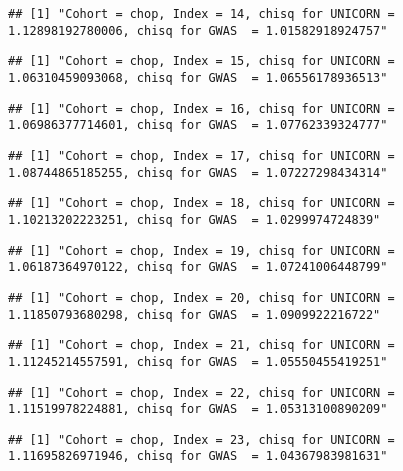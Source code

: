 \documentclass[]{article}
\begin{document}
\begin{verbatim}
## [1] "Cohort = chop, Index = 14, chisq for UNICORN = 1.12898192780006, chisq for GWAS  = 1.01582918924757"
\end{verbatim}

\begin{verbatim}
## [1] "Cohort = chop, Index = 15, chisq for UNICORN = 1.06310459093068, chisq for GWAS  = 1.06556178936513"
\end{verbatim}

\begin{verbatim}
## [1] "Cohort = chop, Index = 16, chisq for UNICORN = 1.06986377714601, chisq for GWAS  = 1.07762339324777"
\end{verbatim}

\begin{verbatim}
## [1] "Cohort = chop, Index = 17, chisq for UNICORN = 1.08744865185255, chisq for GWAS  = 1.07227298434314"
\end{verbatim}

\begin{verbatim}
## [1] "Cohort = chop, Index = 18, chisq for UNICORN = 1.10213202223251, chisq for GWAS  = 1.0299974724839"
\end{verbatim}

\begin{verbatim}
## [1] "Cohort = chop, Index = 19, chisq for UNICORN = 1.06187364970122, chisq for GWAS  = 1.07241006448799"
\end{verbatim}

\begin{verbatim}
## [1] "Cohort = chop, Index = 20, chisq for UNICORN = 1.11850793680298, chisq for GWAS  = 1.0909922216722"
\end{verbatim}

\begin{verbatim}
## [1] "Cohort = chop, Index = 21, chisq for UNICORN = 1.11245214557591, chisq for GWAS  = 1.05550455419251"
\end{verbatim}

\begin{verbatim}
## [1] "Cohort = chop, Index = 22, chisq for UNICORN = 1.11519978224881, chisq for GWAS  = 1.05313100890209"
\end{verbatim}

\begin{verbatim}
## [1] "Cohort = chop, Index = 23, chisq for UNICORN = 1.11695826971946, chisq for GWAS  = 1.04367983981631"
\end{verbatim}
\end{document}

